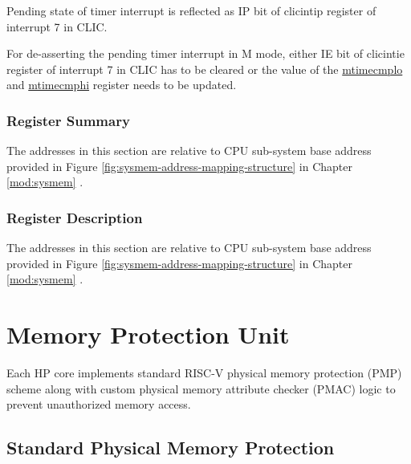 \documentclass[main\_\_EN.tex]{subfiles}
\begin{document}
Pending state of timer interrupt is reflected as IP bit of clicintip register of interrupt 7 in CLIC.

For de-asserting the pending timer interrupt in M mode, either IE bit of clicintie register of interrupt 7 in CLIC has to be cleared or the value of the \hyperref[regdesc:CLINTMTIMECMPLOREG]{mtimecmplo} and \hyperref[regdesc:CLINTMTIMECMPHIREG]{mtimecmphi} register needs to be updated.


\hypertarget{riscvcpu-clint-reg-summ}{}
\subsubsection{Register Summary}
\label{sec:riscvcpu-clint-reg-summ}

The addresses in this section are relative to CPU sub-system base address provided in Figure \ref{fig:sysmem-address-mapping-structure} in Chapter \ref{mod:sysmem} \textit{}.




\subsubsection{Register Description}

The addresses in this section are relative to CPU sub-system base address provided in Figure \ref{fig:sysmem-address-mapping-structure} in Chapter \ref{mod:sysmem} \textit{}.



\newpage
\section{Memory Protection Unit}
Each HP core implements standard RISC-V physical memory protection (PMP) scheme along with custom physical memory attribute checker (PMAC) logic to prevent unauthorized memory access.

\subsection{Standard Physical Memory Protection}
\label{sec:riscvcpu-pmp}
\end{document}
